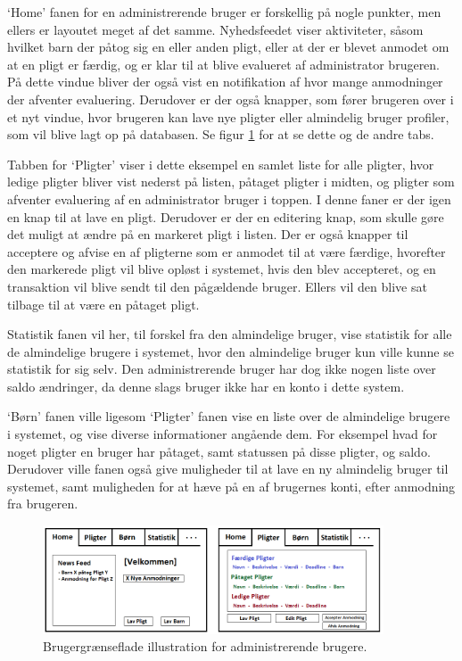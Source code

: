 ‘Home’ fanen for en administrerende bruger er forskellig på nogle punkter, men ellers er layoutet meget af det samme. Nyhedsfeedet viser aktiviteter, såsom hvilket barn der påtog sig en eller anden pligt, eller at der er blevet anmodet om at en pligt er færdig, og er klar til at blive evalueret af administrator brugeren. På dette vindue bliver der også vist en notifikation af hvor mange anmodninger der afventer evaluering. Derudover er der også knapper, som fører brugeren over i et nyt vindue, hvor brugeren kan lave nye pligter eller almindelig bruger profiler, som vil blive lagt op på databasen. Se figur \ref{ForalderUI} for at se dette og de andre tabs.

Tabben for ‘Pligter’ viser i dette eksempel en samlet liste for alle pligter, hvor ledige pligter bliver vist nederst på listen, påtaget pligter i midten, og pligter som afventer evaluering af en administrator bruger i toppen. I denne faner er der igen en knap til at lave en pligt. Derudover er der en editering knap, som skulle gøre det muligt at ændre på en markeret pligt i listen. Der er også knapper til acceptere og afvise en af pligterne som er anmodet til at være færdige, hvorefter den markerede pligt vil blive opløst i systemet, hvis den blev accepteret, og en transaktion vil blive sendt til den pågældende bruger. Ellers vil den blive sat tilbage til at være en påtaget pligt. 

Statistik fanen vil her, til forskel fra den almindelige bruger, vise statistik for alle de almindelige brugere i systemet, hvor den almindelige bruger kun ville kunne se statistik for sig selv. Den administrerende bruger har dog ikke nogen liste over saldo ændringer, da denne slags bruger ikke har en konto i dette system. 

‘Børn’ fanen ville ligesom ‘Pligter’ fanen vise en liste over de almindelige brugere i systemet, og vise diverse informationer angående dem. For eksempel hvad for noget pligter en bruger har påtaget, samt statussen på disse pligter, og saldo. Derudover ville fanen også give muligheder til at lave en ny almindelig bruger til systemet, samt muligheden for at hæve på en af brugernes konti, efter anmodning fra brugeren.

\begin{figure}[H]
\centering
\includegraphics[width=0.9\textwidth]{Billeder/ForalderUI.png}
\caption{Brugergrænseflade illustration for administrerende brugere.}
\label{ForalderUI}
\end{figure}